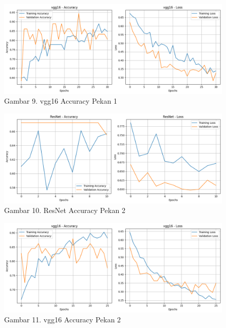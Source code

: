 \documentclass[12pt,a4paper]{article}
\begin{document}
\begin{adjustwidth}{3em}{0pt}
\begin{figure}[H]
    \centering
    \includegraphics[width=1\linewidth]{Images/akurasipekan1vgg16.png}
    \caption*{Gambar 9.  vgg16 Accuracy Pekan 1}
    \label{fig:dataset_collection}
\end{figure}

\begin{figure}[H]
    \centering
    \includegraphics[width=1\linewidth]{Images/akurasipekan2resnet.png}
    \caption*{Gambar 10.  ResNet Accuracy Pekan 2}
    \label{fig:dataset_collection}
\end{figure}

\begin{figure}[H]
    \centering
    \includegraphics[width=1\linewidth]{Images/akurasipekan2vgg.png}
    \caption*{Gambar 11. vgg16 Accuracy Pekan 2}
    \label{fig:dataset_collection}
\end{figure}


\end{adjustwidth}
\end{document}
